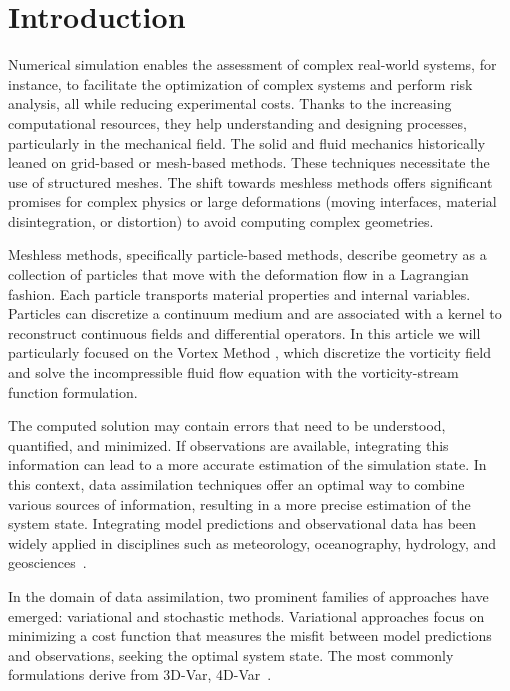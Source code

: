 
\section{Introduction}

Numerical simulation enables the assessment of complex real-world systems, for instance, to facilitate the optimization of complex systems and perform risk analysis, all while reducing experimental costs. Thanks to the increasing computational resources, they help understanding and designing processes, particularly in the mechanical field.
The solid and fluid mechanics historically leaned on grid-based or mesh-based methods. These techniques necessitate the use of structured meshes. The shift towards meshless methods offers significant promises for complex physics or large deformations (moving interfaces, material disintegration, or distortion) to avoid computing complex geometries.

Meshless methods, specifically particle-based methods, describe geometry as a collection of particles that move with the deformation flow in a Lagrangian fashion. Each particle transports material properties and internal variables. Particles can discretize a continuum medium and are associated with a kernel to reconstruct continuous fields and differential operators. In this article we will particularly focused on the Vortex Method \cite{cottet_vortex_2000,mimeau_review_2021}, which discretize the vorticity field and solve the incompressible fluid flow equation with the vorticity-stream function formulation.
\newline

The computed solution may contain errors that need to be understood, quantified, and minimized. If observations are available, integrating this information can lead to a more accurate estimation of the simulation state. In this context, data assimilation techniques offer an optimal way to combine various sources of information, resulting in a more precise estimation of the system state. Integrating model predictions and observational data has been widely applied in disciplines such as meteorology, oceanography, hydrology, and geosciences~\cite{bocquet_introduction_2014}.

In the domain of data assimilation, two prominent families of approaches have emerged: variational and stochastic methods. Variational approaches \cite{variational_method} focus on minimizing a cost function that measures the misfit between model predictions and observations, seeking the optimal system state. The most commonly formulations derive from 3D-Var, 4D-Var~\cite{talagrand1997assimilation}.


